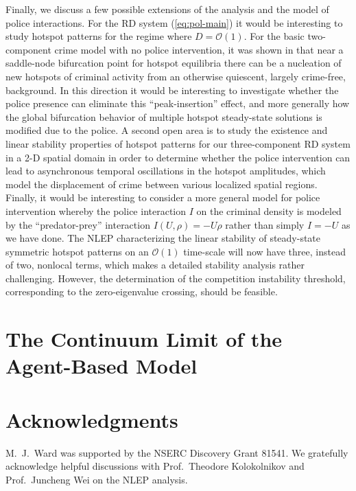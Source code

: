 \documentclass{article}%
\begin{document}
Finally, we discuss a few possible extensions of the analysis and the
model of police interactions. For the RD system (\ref{eq:pol-main}) it
would be interesting to study hotspot patterns for the regime where
$D={\mathcal O}(1)$. For the basic two-component crime model with no
police intervention, it was shown in \cite{tw} that near a saddle-node
bifurcation point for hotspot equilibria there can be a nucleation of
new hotspots of criminal activity from an otherwise quiescent, largely
crime-free, background. In this direction it would be interesting to
investigate whether the police presence can eliminate this
``peak-insertion'' effect, and more generally how the global
bifurcation behavior of multiple hotspot steady-state solutions is
modified due to the police.  A second open area is to study the
existence and linear stability properties of hotspot patterns for our
three-component RD system in a 2-D spatial domain in order to
determine whether the police intervention can lead to asynchronous
temporal oscillations in the hotspot amplitudes, which model the
displacement of crime between various localized spatial regions.
Finally, it would be interesting to consider a more general model for
police intervention whereby the police interaction $I$ on the criminal
density is modeled by the ``predator-prey'' interaction
$I(U,\rho)=-U\rho$ rather than simply $I=-U$ as we have done.  The
NLEP characterizing the linear stability of steady-state symmetric
hotspot patterns on an ${\mathcal O}(1)$ time-scale will now have
three, instead of two, nonlocal terms, which makes a detailed
stability analysis rather challenging. However, the determination of
the competition instability threshold, corresponding to the
zero-eigenvalue crossing, should be feasible.

\appendix

\section{The Continuum Limit of the Agent-Based Model} 

\section*{Acknowledgments}
M.~J.~Ward was supported by the NSERC Discovery Grant 81541. We
gratefully acknowledge helpful discussions with Prof.~Theodore
Kolokolnikov and Prof.~Juncheng Wei on the NLEP analysis.
\end{document}
